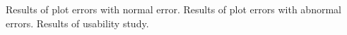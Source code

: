Results of plot errors with normal error.
Results of plot errors with abnormal errors.
Results of usability study.


